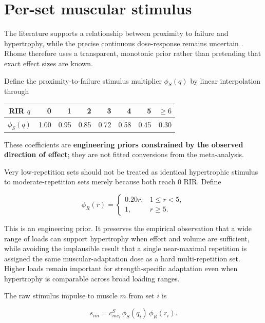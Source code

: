 \documentclass[11pt]{article}
\begin{document}
\section{Per-set muscular stimulus}

The literature supports a relationship between proximity to failure and hypertrophy, while the precise continuous dose-response remains uncertain \cite{robinson2024}. Rhome therefore uses a transparent, monotonic prior rather than pretending that exact effect sizes are known.

Define the proximity-to-failure stimulus multiplier $\phi_S(q)$ by linear interpolation through

\begin{center}
\begin{tabular}{c|rrrrrrr}
RIR $q$ & 0 & 1 & 2 & 3 & 4 & 5 & $\ge6$ \\
\hline
$\phi_S(q)$ & 1.00 & 0.95 & 0.85 & 0.72 & 0.58 & 0.45 & 0.30
\end{tabular}
\end{center}

These coefficients are \textbf{engineering priors constrained by the observed direction of effect}; they are not fitted conversions from the meta-analysis.

Very low-repetition sets should not be treated as identical hypertrophic stimulus to moderate-repetition sets merely because both reach 0 RIR. Define

\begin{equation}
\phi_R(r)=
\begin{cases}
0.20r, & 1\le r<5,\\
1, & r\ge5.
\end{cases}
\end{equation}

This is an engineering prior. It preserves the empirical observation that a wide range of loads can support hypertrophy when effort and volume are sufficient, while avoiding the implausible result that a single near-maximal repetition is assigned the same muscular-adaptation dose as a hard multi-repetition set. Higher loads remain important for strength-specific adaptation even when hypertrophy is comparable across broad loading ranges.

The raw stimulus impulse to muscle $m$ from set $i$ is

\begin{equation}
s_{im}=c^{S}_{m e_i}\,\phi_S(q_i)\,\phi_R(r_i).
\end{equation}
\end{document}
